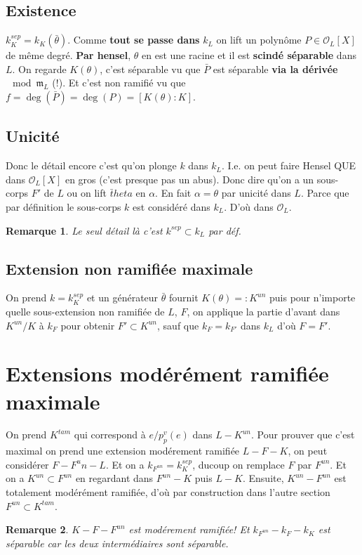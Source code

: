 \documentclass[a4paper,12pt]{book}
\newcommand{\Or}{\mathcal{O}}
\newcommand{\m}{\mathfrak m}
\theoremstyle{plain}
\newtheorem{rem}{Remarque}
\theoremstyle{definition}
\theoremstyle{remark}
\begin{document}
\subsection{Existence}
$k_K^{sep}=k_K(\bar\theta)$. Comme \textbf{tout se passe dans} 
$k_L$ on lift un polynôme $P\in\Or_L[X]$ de même degré. 
\textbf{Par hensel},
$\theta$ en est une racine et il est \textbf{scindé séparable} dans
$L$. On regarde $K(\theta)$, c'est séparable vu que $\bar P$ est
séparable \textbf{via la dérivée} $\mod \m_L$ (!). Et c'est non
ramifié vu que $f=\deg(\bar P)=\deg(P)=[K(\theta):K]$.
\subsection{Unicité}
Donc le détail encore c'est qu'on plonge $k$ dans $k_L$. I.e.
on peut faire Hensel QUE dans $\Or_L[X]$ en gros (c'est presque
pas un abus). Donc dire qu'on a un sous-corps $F'$ de $L$ ou on
lift $\bar theta$ en $\alpha$. En fait $\alpha=\theta$ par unicité
dans $L$. Parce que par définition le sous-corps $k$ est considéré
dans $k_L$. D'où dans $\Or_L$.
\begin{rem}
    Le seul détail là c'est $k^{sep}\subset k_L$ par déf.
\end{rem}

\subsection{Extension non ramifiée maximale}
On prend $k=k_K^{sep}$ et un générateur $\bar \theta$ fournit
$K(\theta)=:K^{un}$ puis pour n'importe quelle sous-extension non
ramifiée de $L$, $F$, on applique la partie d'avant dans $K^{un}/K$
à $k_F$ pour obtenir $F'\subset K^{un}$, sauf que $k_F=k_{F'}$
dans $k_L$ d'où $F=F'$.

\section{Extensions modérément ramifiée maximale}
On prend $K^{tam}$ qui correspond à $e/p^v_p(e)$ dans $L-K^{un}$.
Pour prouver que c'est maximal on prend une extension modérement
ramifiée $L-F-K$, on peut considérer $F-F^un-L$. Et on a
$k_{F^{un}}=k_K^{sep}$, ducoup on remplace $F$ par $F^{un}$. Et
on a $K^{un}\subset F^{un}$ en regardant dans $F^{un}-K$ puis
$L-K$. Ensuite, $K^{un}-F^{un}$ est totalement modérément ramifiée,
d'où par construction dans l'autre section $F^{un}\subset K^{tam}$.

\begin{rem}
    $K-F-F^{un}$ est modérement ramifiée! Et $k_{F^{un}}-k_F-k_K$
    est séparable car les deux intermédiaires sont séparable.
\end{rem}
\end{document}
